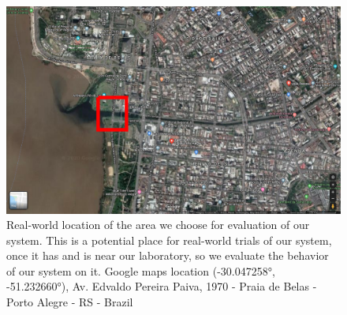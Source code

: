     \begin{figure}[H]
        \centering
        \includegraphics[scale=0.3]{figs/simulation_diluvio_googleLocation_roundedArea.png}
        \caption{Real-world location of the area we choose for evaluation of our system. This is a potential place for real-world trials of our system, once it has and is near our laboratory, so we evaluate the behavior of our system on it. Google maps location (-30.047258°, -51.232660°), Av. Edvaldo Pereira Paiva, 1970 - Praia de Belas - Porto Alegre - RS - Brazil}
        \label{fig:simulation_diluvio_googleLocation_roundedArea}
    \end{figure}
    
